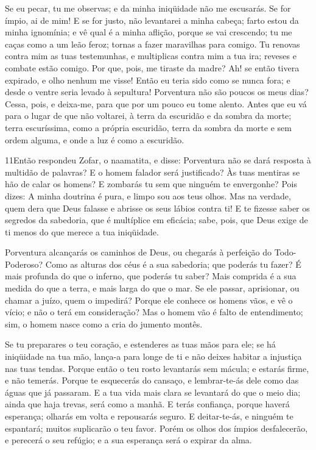 Se eu pecar, tu me observas; e da minha iniqüidade não me
escusarás. Se for ímpio, ai de mim! E se for justo, não
levantarei a minha cabeça; farto estou da minha ignomínia; e vê qual
é a minha aflição, porque se vai crescendo; tu me caças como
a um leão feroz; tornas a fazer maravilhas para comigo. Tu
renovas contra mim as tuas testemunhas, e multiplicas contra mim a
tua ira; reveses e combate estão comigo. Por que, pois, me
tiraste da madre? Ah! se então tivera expirado, e olho nenhum me
visse! Então eu teria sido como se nunca fora; e desde o
ventre seria levado à sepultura! Porventura não são poucos os
meus dias? Cessa, pois, e deixa-me, para que por um pouco eu tome
alento. Antes que eu vá para o lugar de que não voltarei, à
terra da escuridão e da sombra da morte; terra escuríssima,
como a própria escuridão, terra da sombra da morte e sem ordem
alguma, e onde a luz é como a escuridão.

\medskip

\lettrine{11} Então respondeu Zofar, o naamatita, e disse:
Porventura não se dará resposta à multidão de palavras? E o
homem falador será justificado? Às tuas mentiras se hão de calar
os homens? E zombarás tu sem que ninguém te envergonhe? Pois
dizes: A minha doutrina é pura, e limpo sou aos teus olhos. Mas
na verdade, quem dera que Deus falasse e abrisse os seus lábios
contra ti! E te fizesse saber os segredos da sabedoria, que é
multíplice em eficácia; sabe, pois, que Deus exige de ti menos do
que merece a tua iniqüidade.

Porventura alcançarás os caminhos de Deus, ou chegarás à perfeição
do Todo-Poderoso? Como as alturas dos céus é a sua sabedoria;
que poderás tu fazer? É mais profunda do que o inferno, que poderás
tu saber? Mais comprida é a sua medida do que a terra, e mais
larga do que o mar. Se ele passar, aprisionar, ou chamar a
juízo, quem o impedirá? Porque ele conhece os homens vãos, e
vê o vício; e não o terá em consideração? Mas o homem vão é
falto de entendimento; sim, o homem nasce como a cria do jumento
montês.

Se tu preparares o teu coração, e estenderes as tuas mãos para
ele; se há iniqüidade na tua mão, lança-a para longe de ti e
não deixes habitar a injustiça nas tuas tendas. Porque então
o teu rosto levantarás sem mácula; e estarás firme, e não temerás.
Porque te esquecerás do cansaço, e lembrar-te-ás dele como
das águas que já passaram. E a tua vida mais clara se
levantará do que o meio dia; ainda que haja trevas, será como a
manhã. E terás confiança, porque haverá esperança; olharás em
volta e repousarás seguro. E deitar-te-ás, e ninguém te
espantará; muitos suplicarão o teu favor. Porém os olhos dos
ímpios desfalecerão, e perecerá o seu refúgio; e a sua esperança
será o expirar da alma.

